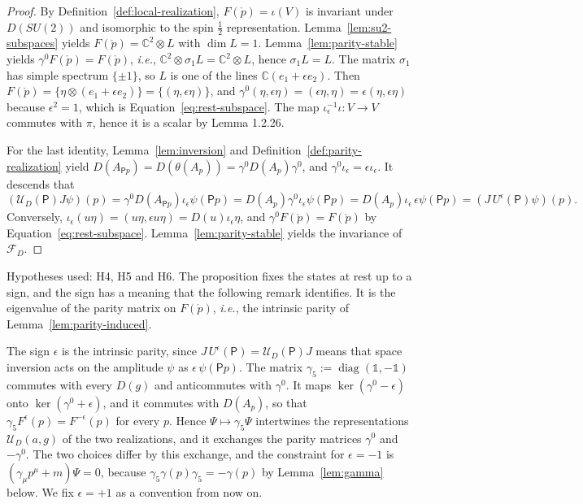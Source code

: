 \begin{proof}
	By Definition~\ref{def:local-realization}, $F(\mathring{p})=\iota(V)$ is invariant under $D(SU(2))$ and isomorphic to the spin $\frac12$ representation. Lemma~\ref{lem:su2-subspaces} yields $F(\mathring{p})=\mathbb{C}^2\otimes L$ with $\dim L=1$. Lemma~\ref{lem:parity-stable} yields $\gamma^0F(\mathring{p})=F(\mathring{p})$, \textit{i.e.}, $\mathbb{C}^2\otimes\sigma_1L=\mathbb{C}^2\otimes L$, hence $\sigma_1L=L$. The matrix $\sigma_1$ has simple spectrum $\{\pm1\}$, so $L$ is one of the lines $\mathbb{C}(e_1+\epsilon e_2)$. Then $F(\mathring{p})=\{\eta\otimes(e_1+\epsilon e_2)\}=\{(\eta,\epsilon\eta)\}$, and $\gamma^0(\eta,\epsilon\eta)=(\epsilon\eta,\eta)=\epsilon(\eta,\epsilon\eta)$ because $\epsilon^2=1$, which is Equation~\eqref{eq:rest-subspace}. The map $\iota_\epsilon^{-1}\iota:V\to V$ commutes with $\pi$, hence it is a scalar by Lemma 1.2.26.
	
	For the last identity, Lemma~\ref{lem:inversion} and Definition~\ref{def:parity-realization} yield $D(A_{\mathsf{P}p})=D(\theta(A_p))=\gamma^0D(A_p)\gamma^0$, and $\gamma^0\iota_\epsilon=\epsilon\iota_\epsilon$. It descends that
	\begin{equation*}
		(\mathcal{U}_D(\mathsf{P})J\psi)(p)=\gamma^0D(A_{\mathsf{P}p})\iota_\epsilon\psi(\mathsf{P}p)=D(A_p)\gamma^0\iota_\epsilon\psi(\mathsf{P}p)=D(A_p)\iota_\epsilon\,\epsilon\psi(\mathsf{P}p)=(J\,U^\epsilon(\mathsf{P})\psi)(p).
	\end{equation*}
	Conversely, $\iota_\epsilon(u\eta)=(u\eta,\epsilon u\eta)=D(u)\iota_\epsilon\eta$, and $\gamma^0F(\mathring{p})=F(\mathring{p})$ by Equation~\eqref{eq:rest-subspace}. Lemma~\ref{lem:parity-stable} yields the invariance of $\mathcal{F}_D$.
\end{proof}

\noindent Hypotheses used: H4, H5 and H6. The proposition fixes the states at rest up to a sign, and the sign has a meaning that the following remark identifies. It is the eigenvalue of the parity matrix on $F(\mathring{p})$, \textit{i.e.}, the intrinsic parity of Lemma~\ref{lem:parity-induced}.

\begin{remark}\label{rem:intrinsic-parity}
	The sign $\epsilon$ is the intrinsic parity, since $J\,U^\epsilon(\mathsf{P})=\mathcal{U}_D(\mathsf{P})J$ means that space inversion acts on the amplitude $\psi$ as $\epsilon\,\psi(\mathsf{P}p)$. The matrix $\gamma_5:=\operatorname{diag}(\mathbb{1},-\mathbb{1})$ commutes with every $D(g)$ and anticommutes with $\gamma^0$. It maps $\ker(\gamma^0-\epsilon)$ onto $\ker(\gamma^0+\epsilon)$, and it commutes with $D(A_p)$, so that $\gamma_5F^{\epsilon}(p)=F^{-\epsilon}(p)$ for every $p$. Hence $\Psi\mapsto\gamma_5\Psi$ intertwines the representations $\mathcal{U}_D(a,g)$ of the two realizations, and it exchanges the parity matrices $\gamma^0$ and $-\gamma^0$. The two choices differ by this exchange, and the constraint for $\epsilon=-1$ is $(\gamma_\mu p^\mu+m)\Psi=0$, because $\gamma_5\gamma(p)\gamma_5=-\gamma(p)$ by Lemma~\ref{lem:gamma} below. We fix $\epsilon=+1$ as a convention from now on.
\end{remark}

